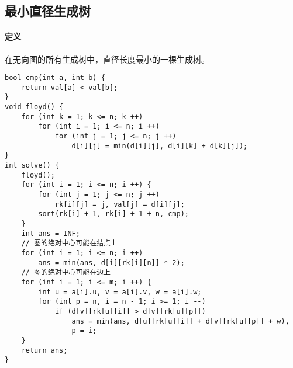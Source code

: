 \subsection{最小直径生成树}

\paragraph{定义} 在无向图的所有生成树中，直径长度最小的一棵生成树。

\begin{verbatim}
bool cmp(int a, int b) {
    return val[a] < val[b];
}
void floyd() {
    for (int k = 1; k <= n; k ++)
        for (int i = 1; i <= n; i ++)
            for (int j = 1; j <= n; j ++)
                d[i][j] = min(d[i][j], d[i][k] + d[k][j]);
}
int solve() {
    floyd();
    for (int i = 1; i <= n; i ++) {
        for (int j = 1; j <= n; j ++) 
            rk[i][j] = j, val[j] = d[i][j];
        sort(rk[i] + 1, rk[i] + 1 + n, cmp);
    }
    int ans = INF;
    // 图的绝对中心可能在结点上
    for (int i = 1; i <= n; i ++)
        ans = min(ans, d[i][rk[i][n]] * 2);
    // 图的绝对中心可能在边上
    for (int i = 1; i <= m; i ++) {
        int u = a[i].u, v = a[i].v, w = a[i].w;
        for (int p = n, i = n - 1; i >= 1; i --)
            if (d[v][rk[u][i]] > d[v][rk[u][p]])
                ans = min(ans, d[u][rk[u][i]] + d[v][rk[u][p]] + w),
                p = i;
    }
    return ans;
}
\end{verbatim}


